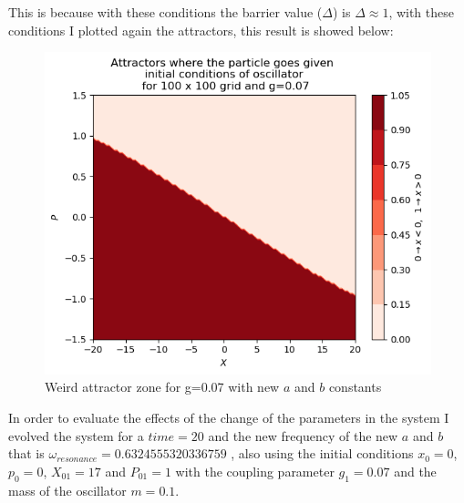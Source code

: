 \documentclass[idxtotoc,hyperref,openany]{labbook} %
\begin{document}
This is because with these conditions the barrier value ($\Delta$) is $\Delta\approx 1$, with these conditions I plotted again the attractors, this result is showed below:
\begin{figure}[H] %
\begin{center}
\includegraphics[width=1\linewidth]{ab_fullg0-07Leapfrog.png}
\end{center}
\caption{Weird attractor zone for g=0.07 with new $a$ and $b$ constants}
\label{WeirdAttractorg0-05New_ab}
\end{figure}
In order to evaluate the effects of the change of the parameters in the system I evolved the system for a $time=20$ and the new frequency of the new $a$ and $b$ that is $\omega_{resonance}=0.6324555320336759$ , also using the initial conditions $x_0=0$, $p_0=0$, $X_01=17$ and $P_01=1$ with the coupling parameter $g_1=0.07$ and the mass of the oscillator $m=0.1$.
\end{document}

